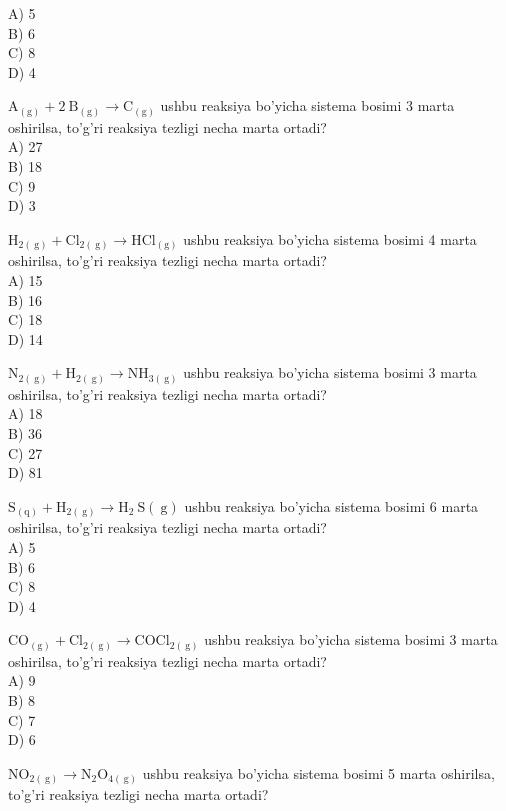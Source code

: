 A) 5\\
B) 6\\
C) 8\\
D) 4
  \item $\mathrm{A}_{(\mathrm{g})}+2 \mathrm{~B}_{(\mathrm{g})} \rightarrow \mathrm{C}_{(\mathrm{g})}$ ushbu reaksiya bo'yicha sistema bosimi 3 marta oshirilsa, to'g'ri reaksiya tezligi necha marta ortadi?\\
A) 27\\
B) 18\\
C) 9\\
D) 3
  \item $\mathrm{H}_{2(\mathrm{~g})}+\mathrm{Cl}_{2(\mathrm{~g})} \rightarrow \mathrm{HCl}_{(\mathrm{g})}$ ushbu reaksiya bo'yicha sistema bosimi 4 marta oshirilsa, to'g'ri reaksiya tezligi necha marta ortadi?\\
A) 15\\
B) 16\\
C) 18\\
D) 14
  \item $\mathrm{N}_{2(\mathrm{~g})}+\mathrm{H}_{2(\mathrm{~g})} \rightarrow \mathrm{NH}_{3(\mathrm{~g})}$ ushbu reaksiya bo'yicha sistema bosimi 3 marta oshirilsa, to'g'ri reaksiya tezligi necha marta ortadi?\\
A) 18\\
B) 36\\
C) 27\\
D) 81
  \item $\mathrm{S}_{(\mathrm{q})}+\mathrm{H}_{2(\mathrm{~g})} \rightarrow \mathrm{H}_{2} \mathrm{~S}(\mathrm{~g})$ ushbu reaksiya bo'yicha sistema bosimi 6 marta oshirilsa, to'g'ri reaksiya tezligi necha marta ortadi?\\
A) 5\\
B) 6\\
C) 8\\
D) 4
  \item $\mathrm{CO}_{(\mathrm{g})}+\mathrm{Cl}_{2(\mathrm{~g})} \rightarrow \mathrm{COCl}_{2(\mathrm{~g})}$ ushbu reaksiya bo'yicha sistema bosimi 3 marta oshirilsa, to'g'ri reaksiya tezligi necha marta ortadi?\\
A) 9\\
B) 8\\
C) 7\\
D) 6
  \item $\mathrm{NO}_{2(\mathrm{~g})} \rightarrow \mathrm{N}_{2} \mathrm{O}_{4(\mathrm{~g})}$ ushbu reaksiya bo'yicha sistema bosimi 5 marta oshirilsa, to'g'ri reaksiya tezligi necha marta ortadi?\\
